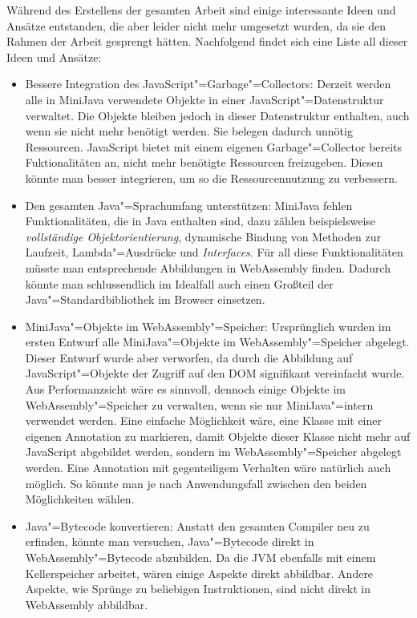 Während des Erstellens der gesamten Arbeit sind einige interessante Ideen und Ansätze entstanden, die aber leider nicht mehr umgesetzt wurden, da sie den Rahmen der Arbeit gesprengt hätten. Nachfolgend findet sich eine Liste all dieser Ideen und Ansätze:
\begin{itemize}
    \item Bessere Integration des JavaScript"=Garbage"=Collectors: Derzeit werden alle in MiniJava verwendete Objekte in einer JavaScript"=Datenstruktur verwaltet. Die Objekte bleiben jedoch in dieser Datenstruktur enthalten, auch wenn sie nicht mehr benötigt werden. Sie belegen dadurch unnötig Ressourcen. JavaScript bietet mit einem eigenen Garbage"=Collector bereits Fuktionalitäten an, nicht mehr benötigte Ressourcen freizugeben. Diesen könnte man besser integrieren, um so die Ressourcennutzung zu verbessern.
    \item Den gesamten Java"=Sprachumfang unterstützen: MiniJava fehlen Funktionalitäten, die in Java enthalten sind, dazu zählen beispielsweise \emph{vollständige Objektorientierung}, dynamische Bindung von Methoden zur Laufzeit, Lambda"=Ausdrücke und \emph{Interfaces}. Für all diese Funktionalitäten müsste man entsprechende Abbildungen in WebAssembly finden. Dadurch könnte man schlussendlich im Idealfall auch einen Großteil der Java"=Standardbibliothek im Browser einsetzen.
    \item MiniJava"=Objekte im WebAssembly"=Speicher: Ursprünglich wurden im ersten Entwurf alle MiniJava"=Objekte im WebAssembly"=Speicher abgelegt. Dieser Entwurf wurde aber verworfen, da durch die Abbildung auf JavaScript"=Objekte der Zugriff auf den DOM signifikant vereinfacht wurde. Aus Performanzsicht wäre es sinnvoll, dennoch einige Objekte im WebAssembly"=Speicher zu verwalten, wenn sie nur MiniJava"=intern verwendet werden. Eine einfache Möglichkeit wäre, eine Klasse mit einer eigenen Annotation zu markieren, damit Objekte dieser Klasse nicht mehr auf JavaScript abgebildet werden, sondern im WebAssembly"=Speicher abgelegt werden. Eine Annotation mit gegenteiligem Verhalten wäre natürlich auch möglich. So könnte man je nach Anwendungsfall zwischen den beiden Möglichkeiten wählen.
    \pagebreak
    \item Java"=Bytecode konvertieren: Anstatt den gesamten Compiler neu zu erfinden, könnte man versuchen, Java"=Bytecode direkt in WebAssembly"=Bytecode abzubilden. Da die JVM ebenfalls mit einem Kellerspeicher arbeitet, wären einige Aspekte direkt abbildbar. Andere Aspekte, wie Sprünge zu beliebigen Instruktionen, sind nicht direkt in WebAssembly abbildbar.

\end{itemize}
